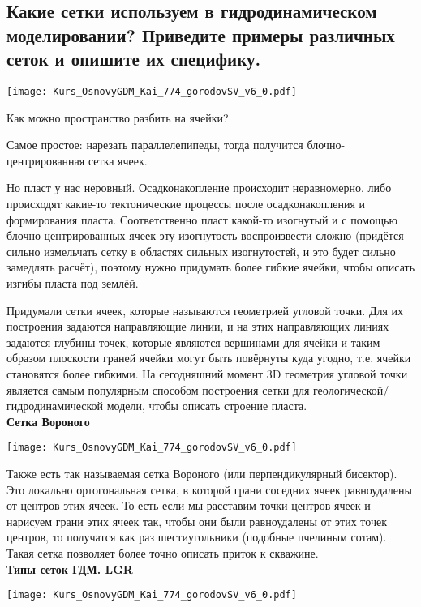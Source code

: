 

\subsection{Какие сетки используем в гидродинамическом моделировании? Приведите примеры различных сеток и опишите их специфику.}

\texttt{[image: Kurs\_OsnovyGDM\_Kai\_774\_gorodovSV\_v6\_0.pdf]}

Как можно пространство разбить на ячейки?

Самое простое: нарезать параллелепипеды, тогда получится блочно-центрированная сетка ячеек.

Но пласт у нас неровный. Осадконакопление происходит неравномерно, либо происходят какие-то тектонические процессы после осадконакопления и формирования пласта.
Соответственно пласт какой-то изогнутый и с помощью блочно-центрированных ячеек эту изогнутость воспроизвести сложно (придётся сильно измельчать сетку в областях сильных изогнутостей, и это будет сильно замедлять расчёт), поэтому нужно придумать более гибкие ячейки, чтобы описать изгибы пласта под землёй.

Придумали сетки ячеек, которые называются геометрией угловой точки.
Для их построения задаются направляющие линии, и на этих направляющих линиях задаются глубины точек, которые являются вершинами для ячейки и таким образом плоскости граней ячейки могут быть повёрнуты куда угодно, т.е. ячейки становятся более гибкими.
На сегодняшний момент 3D геометрия угловой точки является самым популярным способом построения сетки для геологической/гидродинамической модели, чтобы описать строение пласта.
\\

\textbf{Сетка Вороного}

\texttt{[image: Kurs\_OsnovyGDM\_Kai\_774\_gorodovSV\_v6\_0.pdf]}

Также есть так называемая сетка Вороного (или перпендикулярный бисектор).
Это локально ортогональная сетка, в которой грани соседних ячеек равноудалены от центров этих ячеек.
То есть если мы расставим точки центров ячеек и нарисуем грани этих ячеек так, чтобы они были равноудалены от этих точек центров, то получатся как раз шестиугольники (подобные пчелиным сотам).
Такая сетка позволяет более точно описать приток к скважине.
\\

\textbf{Типы сеток ГДМ. LGR}

\texttt{[image: Kurs\_OsnovyGDM\_Kai\_774\_gorodovSV\_v6\_0.pdf]}

